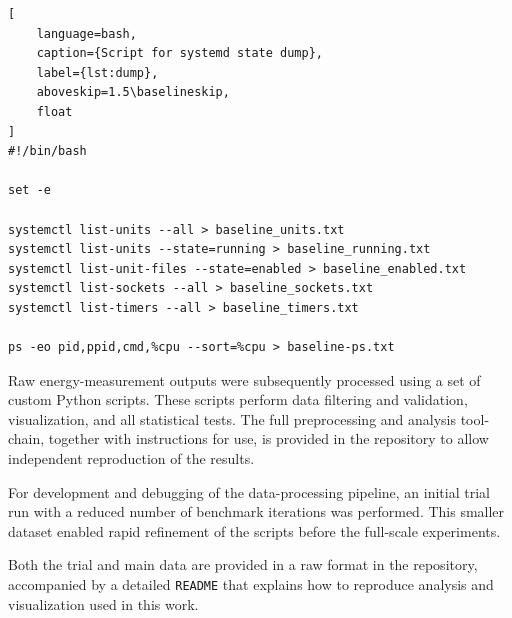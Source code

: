 \begin{samepage}
\begin{lstlisting}[
    language=bash,
    caption={Script for systemd state dump},
    label={lst:dump},
    aboveskip=1.5\baselineskip,
    float
]
#!/bin/bash

set -e

systemctl list-units --all > baseline_units.txt
systemctl list-units --state=running > baseline_running.txt
systemctl list-unit-files --state=enabled > baseline_enabled.txt
systemctl list-sockets --all > baseline_sockets.txt
systemctl list-timers --all > baseline_timers.txt

ps -eo pid,ppid,cmd,%cpu --sort=%cpu > baseline-ps.txt
\end{lstlisting}
\end{samepage}

Raw energy-measurement outputs were subsequently processed using a set of custom
Python scripts. These scripts perform data filtering and validation,
visualization, and all statistical tests. The full preprocessing and analysis
tool-chain, together with instructions for use, is provided in the repository
to allow independent reproduction of the results.

For development and debugging of the data-processing pipeline, an initial
trial run with a reduced number of benchmark iterations was performed.
This smaller dataset enabled rapid refinement of the scripts before the
full-scale experiments.

Both the trial and main data are provided in a raw format in the repository,
accompanied by a detailed \texttt{README} that explains how to reproduce
analysis and visualization used in this work.
